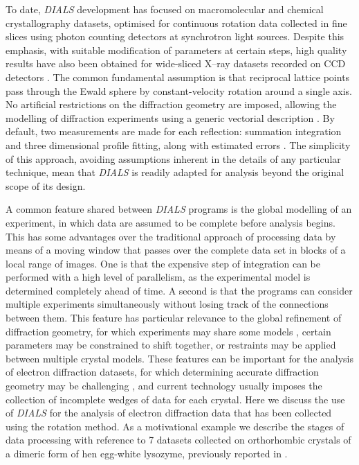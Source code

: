 \documentclass[preprint]{iucr}
\newcommand{\dials}{\emph{DIALS}\xspace}
\begin{document}
To date, \dials development has focused on macromolecular and chemical
crystallography datasets, optimised for continuous rotation data collected in
fine slices using photon counting detectors at synchrotron light sources.
Despite this emphasis, with suitable modification of parameters at certain
steps, high quality results have also been obtained for wide-sliced X--ray
datasets recorded on CCD detectors \cite{dials_adsc:2016a,dials_adsc:2016b}. The common
fundamental assumption is that reciprocal lattice points pass through the Ewald
sphere by constant-velocity rotation around a single axis.
No artificial restrictions on the diffraction geometry are imposed, allowing the
modelling of diffraction experiments using a generic vectorial description
\cite{Waterman2016}. By default, two measurements are made for each reflection:
summation integration and three dimensional profile fitting, along with
estimated errors \cite{Winter2018}. The simplicity of this approach, avoiding
assumptions inherent in the details of any particular technique, mean that
\dials is readily adapted for analysis beyond the original scope of its design.

A common feature shared between \dials programs is the global modelling of an
experiment, in which data are assumed to be complete before analysis begins.
This has some advantages over the traditional approach of processing data by
means of a moving window that passes over the complete data set in blocks of a
local range of images. One is that the expensive step of integration can be
performed with a high level of parallelism, as the experimental model is
determined completely ahead of time. A second is that the programs can consider
multiple experiments simultaneously without losing track of the connections
between them. This feature has particular relevance to the global refinement of
diffraction geometry, for which experiments may share some models
\cite{Waterman2016}, certain parameters may be constrained to shift together,
or restraints may be applied between multiple crystal models. These features
can be important for the analysis of electron diffraction datasets, for which
determining accurate diffraction geometry may be challenging
\cite{review_adt_red:2015}, and current technology usually imposes the
collection of incomplete wedges of data for each crystal. Here we discuss the
use of \dials for the analysis of electron diffraction data that has been
collected using the rotation method. As a motivational example we describe the
stages of data processing with reference to 7 datasets collected on
orthorhombic crystals of a dimeric form of hen egg-white lysozyme, previously
reported in .
\end{document}
